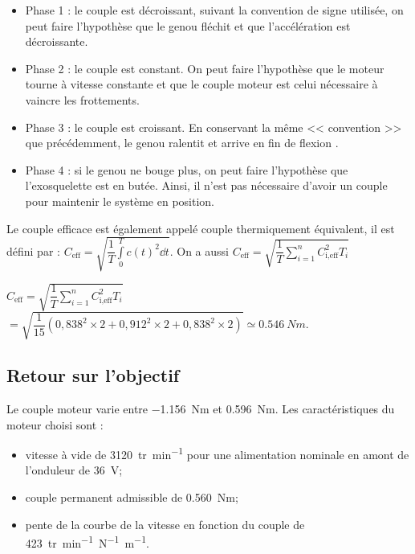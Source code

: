 \ifprof
\begin{corrige}
\begin{itemize}
\item Phase 1 : le couple est décroissant, suivant la convention de signe utilisée, on peut faire l'hypothèse que le genou fléchit et que l’accélération est décroissante.
\item Phase 2 : le couple est constant. On peut faire l'hypothèse que le moteur tourne à vitesse constante et que le couple moteur est celui nécessaire à vaincre les frottements. 
\item Phase 3 : le couple est croissant. En conservant la même << convention >> que précédemment, le genou ralentit et arrive en fin de flexion .
\item Phase 4 : si le genou ne bouge plus, on peut faire l'hypothèse que l'exosquelette est en butée. Ainsi, il n'est pas nécessaire d'avoir un couple pour maintenir le système en position.
\end{itemize}
\end{corrige}
\else
\fi

Le couple efficace est également appelé couple thermiquement équivalent, il est défini par :
$C_{\text{eff}}=\sqrt{\dfrac{1}{T}\int\limits_0^Tc(t)^2 \dd t}$. On a aussi 
$C_{\text{eff}}=\sqrt{\dfrac{1}{T}\sum\limits_{i=1}^n C_{\text{i,eff}}^2 T_i }$


\fi


\ifprof
\begin{corrige}
$C_{\text{eff}}=\sqrt{\dfrac{1}{T}\sum\limits_{i=1}^n C_{\text{i,eff}}^2 T_i }$
$=\sqrt{\dfrac{1}{15}\left(0,838^2 \times 2 +0,912^2 \times 2 + 0,838^2 \times 2 \right) }\simeq \SI{0,546}{Nm}$.
\end{corrige}
\else
\fi


\subsection*{Retour sur l'objectif}

\ifprof
\else

Le couple moteur varie entre \SI{-1,156}{Nm} et \SI{0,596}{Nm}.
Les caractéristiques du moteur choisi sont :
\begin{itemize}
\item vitesse à vide de \SI{3120}{tr.min^{-1}} pour une alimentation nominale en amont de l’onduleur de \SI{36}{V};
\item couple permanent admissible de \SI{0,560}{Nm};
\item pente de la courbe de la vitesse en fonction du couple de \SI{423}{tr.min^{-1}N^{-1}m^{-1}}.
\end{itemize}

